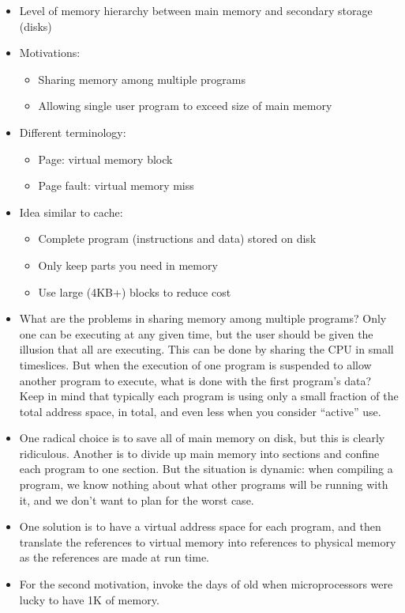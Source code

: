 \setlength{\columnseprule}{1pt}
\def\columnseprulecolor{\color{blue}}


\begin{frame}[fragile]
\begin{itemize}
	\item Level of memory hierarchy between main memory and secondary
		storage (disks)
	\item Motivations: 
	\begin{itemize}
		\item Sharing memory among multiple programs
		\item Allowing single user program to exceed size of main memory
	\end{itemize}
	\item Different terminology:
	\begin{itemize}
		\item Page: virtual memory block
		\item Page fault: virtual memory miss
	\end{itemize} 
	\item Idea similar to cache:
	\begin{itemize}
		\item Complete program (instructions and data) stored on disk
		\item Only keep parts you need in memory
		\item Use large (4KB+) blocks to reduce cost
	\end{itemize}
\end{itemize}
\BNotes\ifnum{}
\begin{itemize}
\item What are the problems in sharing memory among multiple programs?
Only one can be executing at any given time, but the user should be
given the illusion that all are executing. This can be done by sharing
the CPU in small timeslices. But when the execution of one program is
suspended to allow another program to execute, what is done with the
first program's data? Keep in mind that typically each program is
using only a small fraction of the total address space, in total, and
even less when you consider ``active'' use.
\item One radical choice is to save all of main memory on disk, but
this is clearly ridiculous. Another is to divide up main memory into
sections and confine each program to one section. But the situation is
dynamic: when compiling a program, we know nothing about what other
programs will be running with it, and we don't want to plan for the
worst case.
\item One solution is to have a virtual address space for each
program, and then translate the references to virtual memory into
references to physical memory as the references are made at run time.
\item For the second motivation, invoke the days of old when
microprocessors were lucky to have 1K of memory. 


\end{itemize}
\end{frame}
